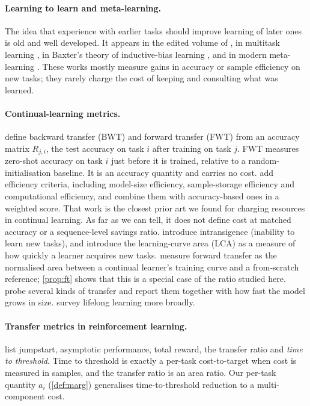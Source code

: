 \documentclass[11pt]{article}
\theoremstyle{remark}
\begin{document}
\paragraph{Learning to learn and meta-learning.}
The idea that experience with earlier tasks should improve learning of later ones is old and well developed.
It appears in the edited volume of \citet{thrun1998learning}, in multitask learning \citep{caruana1997multitask}, in Baxter's theory of inductive-bias learning \citep{baxter2000model}, and in modern meta-learning \citep{finn2017maml,hospedales2022meta}.
These works mostly measure gains in accuracy or sample efficiency on new tasks; they rarely charge the cost of keeping and consulting what was learned.

\paragraph{Continual-learning metrics.}
\citet{lopezpaz2017gem} define backward transfer (BWT) and forward transfer (FWT) from an accuracy matrix $R_{j,i}$, the test accuracy on task $i$ after training on task $j$.
FWT measures zero-shot accuracy on task $i$ just before it is trained, relative to a random-initialisation baseline.
It is an accuracy quantity and carries no cost.
\citet{diazrodriguez2018dont} add efficiency criteria, including model-size efficiency, sample-storage efficiency and computational efficiency, and combine them with accuracy-based ones in a weighted score.
That work is the closest prior art we found for charging resources in continual learning. As far as we can tell, it does not define cost at matched accuracy or a sequence-level savings ratio.
\citet{chaudhry2018rwalk} introduce intransigence (inability to learn new tasks), and \citet{chaudhry2019agem} introduce the learning-curve area (LCA) as a measure of how quickly a learner acquires new tasks.
\citet{wolczyk2021continual} measure forward transfer as the normalised area between a continual learner's training curve and a from-scratch reference; \cref{prop:ft} shows that this is a special case of the ratio studied here.
\citet{veniat2021efficient} probe several kinds of transfer and report them together with how fast the model grows in size.
\citet{chen2018lifelong} survey lifelong learning more broadly.

\paragraph{Transfer metrics in reinforcement learning.}
\citet{taylor2009transfer} list jumpstart, asymptotic performance, total reward, the transfer ratio and \emph{time to threshold}.
Time to threshold is exactly a per-task cost-to-target when cost is measured in samples, and the transfer ratio is an area ratio.
Our per-task quantity $a_i$ (\cref{def:marg}) generalises time-to-threshold reduction to a multi-component cost.
\end{document}
